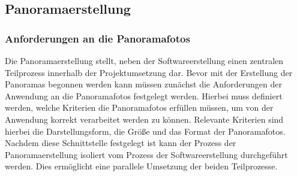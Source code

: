 \subsection{Panoramaerstellung}
\label{sec:Panoramaerstellung}

\subsubsection{Anforderungen an die Panoramafotos}
\label{sec:PanoramaerstellungAnforderungen}

Die Panoramaerstellung stellt, neben der Softwareerstellung einen zentralen
Teilprozess innerhalb der Projektumsetzung dar. Bevor mit der Erstellung der
Panoramas begonnen werden kann müssen zunächst die Anforderungen der Anwendung
an die Panoramafotos festgelegt werden. Hierbei muss definiert werden, welche
Kriterien die Panoramafotos erfüllen müssen, um von der Anwendung korrekt
verarbeitet werden zu können. Relevante Kriterien sind hierbei die
Darstellungsform, die Größe und das Format der Panoramafotos. Nachdem diese
Schnittstelle festgelegt ist kann der Prozess der Panoramaerstellung isoliert
vom Prozess der Softwareerstellung durchgeführt werden. Dies ermöglicht eine
parallele Umsetzung der beiden Teilprozesse.

